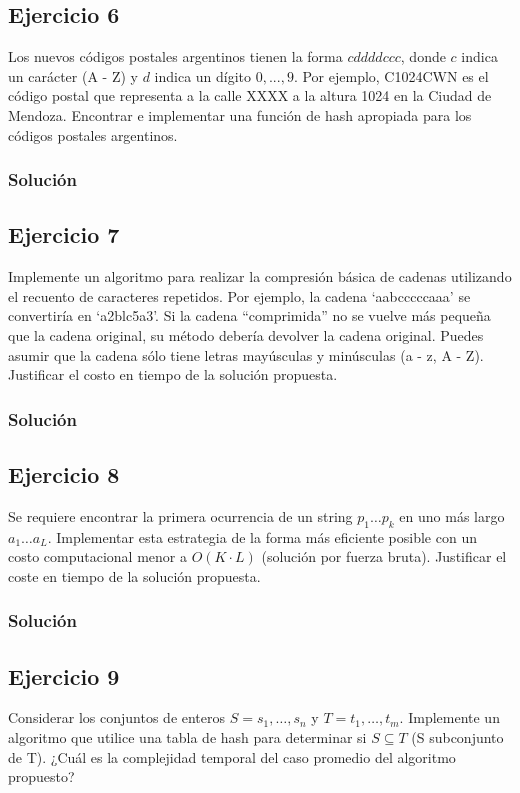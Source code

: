 \documentclass{article}
\begin{document}
\subsection*{Ejercicio 6}
Los nuevos códigos postales argentinos tienen la forma $cddddccc$, donde $c$ indica un carácter (A - Z) y $d$ indica un dígito $0, ... , 9$. Por ejemplo, C1024CWN es el código postal que representa a la calle XXXX a la altura 1024 en la Ciudad de Mendoza. Encontrar e implementar una función de hash apropiada para los códigos postales argentinos.
\subsubsection*{Solución}


\pagebreak
\subsection*{Ejercicio 7}
Implemente un algoritmo para realizar la compresión básica de cadenas utilizando el recuento de caracteres repetidos. Por ejemplo, la cadena `aabcccccaaa' se convertiría en `a2blc5a3'. Si la cadena ``comprimida'' no se vuelve más pequeña que la cadena original, su método debería devolver la cadena original. Puedes asumir que la cadena sólo tiene letras mayúsculas y minúsculas (a - z, A - Z). Justificar el costo en tiempo de la solución propuesta.
\subsubsection*{Solución}


\subsection*{Ejercicio 8}
Se requiere encontrar la primera ocurrencia de un string $p_1 \dots p_k$ en uno más largo $a_1 \dots a_L$. Implementar esta estrategia de la forma más eficiente posible con un costo computacional menor a $O(K\cdot L)$ (solución por fuerza bruta). Justificar el coste en tiempo de la solución propuesta.
\subsubsection*{Solución}
\pagebreak
{}


\subsection*{Ejercicio 9}
Considerar los conjuntos de enteros $S = {s_1, \dots , s_n}$ y $T = {t_1, \dots , t_m}$. Implemente un algoritmo que utilice una tabla de hash para determinar si $S \subseteq T$ (S subconjunto de T). ¿Cuál es la complejidad temporal del caso promedio del algoritmo propuesto?
\end{document}
